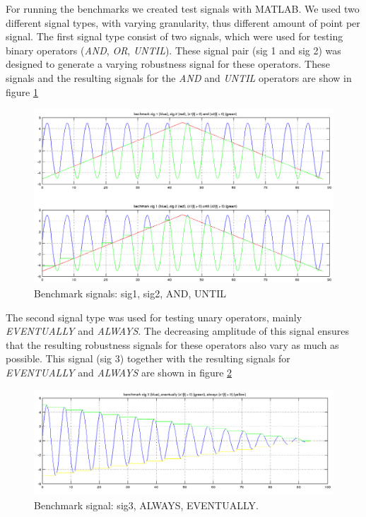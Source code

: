 \documentclass[a4paper,10pt]{article}
\begin{document}
For running the benchmarks we created test signals with MATLAB. We used two different signal types, with varying granularity, thus different amount of point per signal. 
The first signal type consist of two signals, which were used for testing binary operators (\emph{AND}, \emph{OR}, \emph{UNTIL}). These signal pair (sig 1 and sig 2) was designed to generate a varying robustness signal for these operators.
These signals and the resulting signals for the \emph{AND} and \emph{UNTIL} operators are show in figure \ref{fig:sig1_sig2_and_until}

\begin{figure}[H]
    \includegraphics[scale=0.3]{bm_sig1_and_until.png}
    \caption{
        \label{fig:sig1_sig2_and_until}
        Benchmark signals: sig1, sig2, AND, UNTIL}
\end{figure} 
   
The second signal type was used for testing unary operators, mainly \emph{EVENTUALLY} and \emph{ALWAYS}. The decreasing amplitude of this signal ensures that the resulting robustness signals for these operators also vary as much as possible. This signal (sig 3) together with the resulting signals for \emph{EVENTUALLY} and \emph{ALWAYS} are shown in figure \ref{fig:sig3_evtl_alw}

\begin{figure}[H]
    \includegraphics[scale=0.3]{bm_sig3_ev_alw.png}
    \caption{
        \label{fig:sig3_evtl_alw}
        Benchmark signal: sig3, ALWAYS, EVENTUALLY.}
\end{figure}
\end{document}
